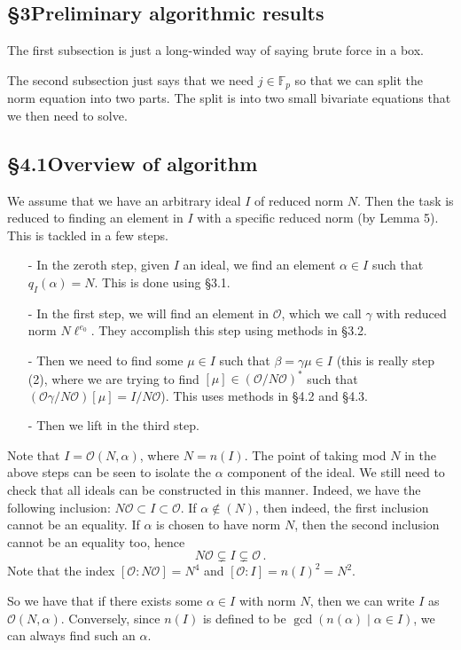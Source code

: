 \documentclass{amsart}
\theoremstyle{definition}\newtheorem*{defn}{Definition}
\theoremstyle{definition}\newtheorem*{eg}{Example}
\newcommand{\F}{\mathbb{F}}
\renewcommand{\O}{\mathcal{O}}
\begin{document}
\subsection*{\S3\hspace{0.5cm}Preliminary algorithmic results}
The first subsection is just a long-winded way of saying brute force in a box.

The second subsection just says that we need $j\in\F_p$ so that we can split the norm equation into two parts. The split is into two small bivariate equations that we then need to solve.

\subsection*{\S4.1\hspace{0.5cm}Overview of algorithm}
We assume that we have an arbitrary ideal $I$ of reduced norm $N$. Then the task is reduced to finding an element in $I$ with a specific reduced norm (by Lemma 5). This is tackled in a few steps. 
\begin{itemize}
\item[-] In the zeroth step, given $I$ an ideal, we find an element $\alpha\in I$ such that $q_I(\alpha)=N$. This is done using \S3.1.
\item[-] In the first step, we will find an element in $\O$, which we call $\gamma$ with reduced norm $N\ell^{e_0}$. They accomplish this step using methods in \S3.2.
\item[-] Then we need to find some $\mu\in I$ such that $\beta=\gamma\mu\in I$ (this is really step (2), where we are trying to find $[\mu]\in(\O/N\O)^*$ such that $(\O\gamma/N\O)[\mu]=I/N\O$). This uses methods in \S4.2 and \S4.3.
\item[-] Then we lift in the third step.
\end{itemize}

Note that $I=\O(N,\alpha)$, where $N=n(I)$. The point of taking mod $N$ in the above steps can be seen to isolate the $\alpha$ component of the ideal. We still need to check that all ideals can be constructed in this manner. Indeed, we have the following inclusion: $N\O\subset I\subset\O$. If $\alpha\notin(N)$, then indeed, the first inclusion cannot be an equality. If $\alpha$ is chosen to have norm $N$, then the second inclusion cannot be an equality too, hence
\[N\O\subsetneq I\subsetneq\O\,.\]
Note that the index $[\O:N\O]=N^4$ and $[\O:I]=n(I)^2=N^2$.

So we have that if there exists some $\alpha\in I$ with norm $N$, then we can write $I$ as $\O(N,\alpha)$. Conversely, since $n(I)$ is defined to be $\gcd(n(\alpha)\mid\alpha\in I)$, we can always find such an $\alpha$.
\end{document}
